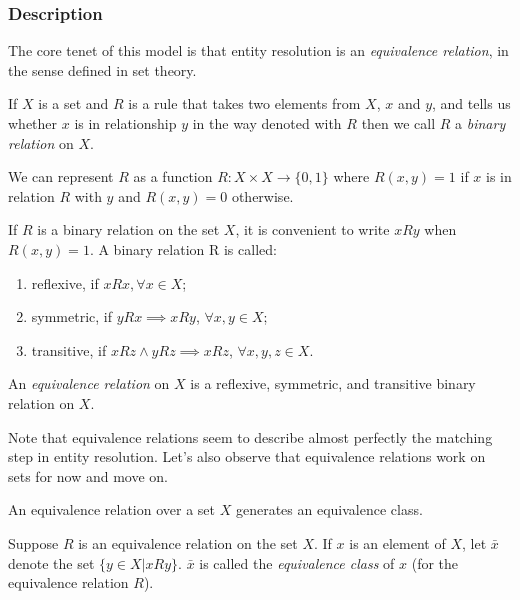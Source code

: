 \documentclass[lettersize,journal]{IEEEtran}
\begin{document}
    \subsubsection[algdesc]{Description}\label{subsubsec:algdesc}

    The core tenet of this model is that entity resolution is an \textit{
    equivalence relation}, in the sense defined in set theory.
    
    \begin{defn} If $X$ is a set and $R$ is a rule that takes two elements from
    $X$, $x$ and $y$, and tells us whether $x$ is in relationship $y$ in the way
    denoted with $R$ then we call $R$ a \textit{binary relation} on
    $X$\cite{hoffman1971linear}.
    \end{defn}

    We can represent $R$ as a function $R:X \times X \rightarrow \{0,1\}$ where
    $R(x,y)=1$ if $x$ is in relation $R$ with $y$ and $R(x,y)=0$ otherwise.
    
    \begin{defn}If $R$ is a binary relation on the set $X$, it is convenient to
    write $xRy$ when $R(x, y) = 1$. A binary relation R is called:

    \begin{enumerate}
        \item reflexive, if $xRx, \forall x \in X$;
        \item symmetric, if $yRx \implies xRy$, $\forall x,y \in X$;
        \item transitive, if $xRz \land yRz \implies xRz$, $\forall x,y,z \in X$.
    \end{enumerate}

    An \textit{equivalence relation} on $X$ is a reflexive, symmetric, and
    transitive binary relation on $X$\cite{hoffman1971linear}.
    \end{defn}

    Note that equivalence relations seem to describe almost perfectly the
    matching step in entity resolution.
    Let's also observe that equivalence relations work on sets for now and move
    on.

    An equivalence relation over a set $X$ generates an equivalence class.

    \begin{defn}Suppose $R$ is an equivalence relation on the set $X$. If $x$ is
    an element of $X$, let $\bar{x}$ denote the set $\{y \in X | xRy\}$.
    $\bar{x}$ is called the \textit{equivalence class} of $x$ (for the
    equivalence relation $R$)\cite{hoffman1971linear}.
    \end{defn}
\end{document}
